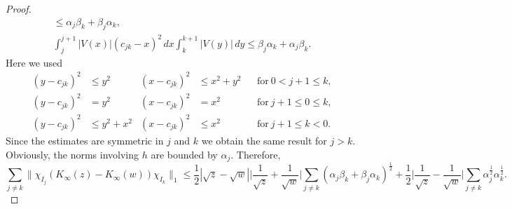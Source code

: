 \begin{proof}
\begin{gather*}
     \leq \alpha_j\beta_k + \beta_j\alpha_k, \\
  \int_j^{j+1} |V(x)|(c_{jk}-x)^2\, dx \int_k^{k+1}|V(y)|\, dy
     \leq \beta_j\alpha_k  + \alpha_j\beta_k .
\end{gather*}
Here we used
\begin{align*}
  (y-c_{jk})^2 & \leq y^2     & (x-c_{jk})^2 & \leq x^2+y^2 && \text{for}\ 0<j+1\leq k ,\\
  (y-c_{jk})^2 & = y^2        & (x-c_{jk})^2 & = x^2        && \text{for}\ j+1\leq 0 \leq k ,\\
  (y-c_{jk})^2 & \leq y^2+x^2 & (x-c_{jk})^2 & \leq x^2     && \text{for}\ j+1\leq k<0 .
\end{align*}
Since the estimates are symmetric in $j$ and $k$ we obtain the same result for $j>k$.
Obviously, the norms involving $h$ are bounded by $\alpha_j$. Therefore,
\begin{equation*}
  \sum_{j\neq k} \|\chi_{I_j}(K_\infty(z) - K_\infty(w))\chi_{I_k}\|_1
     \leq \frac{1}{2}|\sqrt{z}-\sqrt{w}| \Big|\frac{1}{\sqrt{z}}+\frac{1}{\sqrt{w}}\Big| 
           \sum_{j\neq k} (\alpha_j\beta_k+\beta_j\alpha_k)^{\frac{1}{2}} 
      + \frac{1}{2}\Big|\frac{1}{\sqrt{z}}-\frac{1}{\sqrt{w}}\Big| \sum_{j\neq k} \alpha_j^{\frac{1}{2}}\alpha_k^{\frac{1}{2}} .
\end{equation*}


\end{proof}
